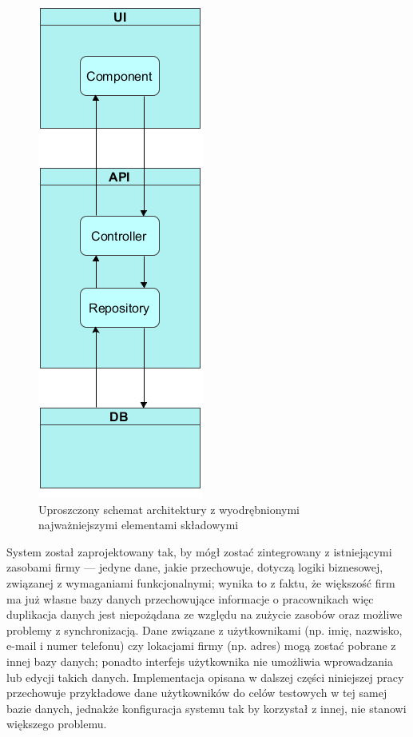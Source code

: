 \documentclass[eng,printmode,openany]{mgr}
\begin{document}
\begin{figure}[h]
	\centering
	\includegraphics[scale=0.6]{images/architecture.png}
	\caption{Uproszczony schemat architektury z wyodrębnionymi najważniejszymi elementami składowymi}
\end{figure}


System został zaprojektowany tak, by mógł zostać zintegrowany z istniejącymi zasobami firmy — jedyne dane, jakie przechowuje, dotyczą logiki biznesowej, związanej z wymaganiami funkcjonalnymi; wynika to z faktu, że większość firm ma już własne bazy danych przechowujące informacje o pracownikach więc duplikacja danych jest niepożądana ze względu na zużycie zasobów oraz możliwe problemy z synchronizacją. Dane związane z użytkownikami (np. imię, nazwisko, e-mail i numer telefonu) czy lokacjami firmy (np. adres) mogą zostać pobrane z innej bazy danych; ponadto interfejs użytkownika nie umożliwia wprowadzania lub edycji takich danych. Implementacja opisana w dalszej części niniejszej pracy przechowuje przykładowe dane użytkowników do celów testowych w tej samej bazie danych, jednakże konfiguracja systemu tak by korzystał z innej, nie stanowi większego problemu.
\end{document}
